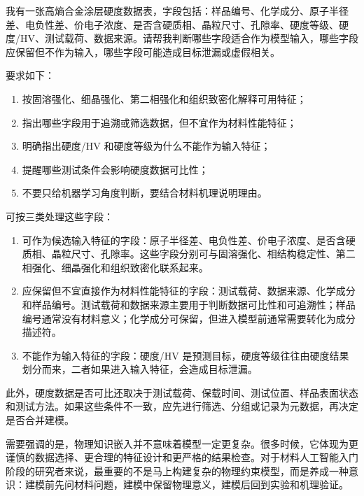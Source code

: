 \begin{samepage}
\begin{userbox}
我有一张高熵合金涂层硬度数据表，字段包括：样品编号、化学成分、原子半径差、电负性差、价电子浓度、是否含硬质相、晶粒尺寸、孔隙率、硬度等级、硬度/HV、测试载荷、数据来源。请帮我判断哪些字段适合作为模型输入，哪些字段应保留但不作为输入，哪些字段可能造成目标泄漏或虚假相关。

要求如下：
\begin{enumerate}
\item 按固溶强化、细晶强化、第二相强化和组织致密化解释可用特征；
\item 指出哪些字段用于追溯或筛选数据，但不宜作为材料性能特征；
\item 明确指出硬度/HV 和硬度等级为什么不能作为输入特征；
\item 提醒哪些测试条件会影响硬度数据可比性；
\item 不要只给机器学习角度判断，要结合材料机理说明理由。
\end{enumerate}
\end{userbox}

\begin{aibox}
可按三类处理这些字段：

\begin{enumerate}
\item 可作为候选输入特征的字段：原子半径差、电负性差、价电子浓度、是否含硬质相、晶粒尺寸、孔隙率。这些字段分别可与固溶强化、相结构稳定性、第二相强化、细晶强化和组织致密化联系起来。
\item 应保留但不宜直接作为材料性能特征的字段：测试载荷、数据来源、化学成分和样品编号。测试载荷和数据来源主要用于判断数据可比性和可追溯性；样品编号通常没有材料意义；化学成分可保留，但进入模型前通常需要转化为成分描述符。
\item 不能作为输入特征的字段：硬度/HV 是预测目标，硬度等级往往由硬度结果划分而来，二者如果进入输入特征，会造成目标泄漏。
\end{enumerate}

此外，硬度数据是否可比还取决于测试载荷、保载时间、测试位置、样品表面状态和测试方法。如果这些条件不一致，应先进行筛选、分组或记录为元数据，再决定是否合并建模。
\end{aibox}
\end{samepage}

需要强调的是，物理知识嵌入并不意味着模型一定更复杂。很多时候，它体现为更谨慎的数据选择、更合理的特征设计和更严格的结果检查。对于材料人工智能入门阶段的研究者来说，最重要的不是马上构建复杂的物理约束模型，而是养成一种意识：建模前先问材料问题，建模中保留物理意义，建模后回到实验和机理验证。


